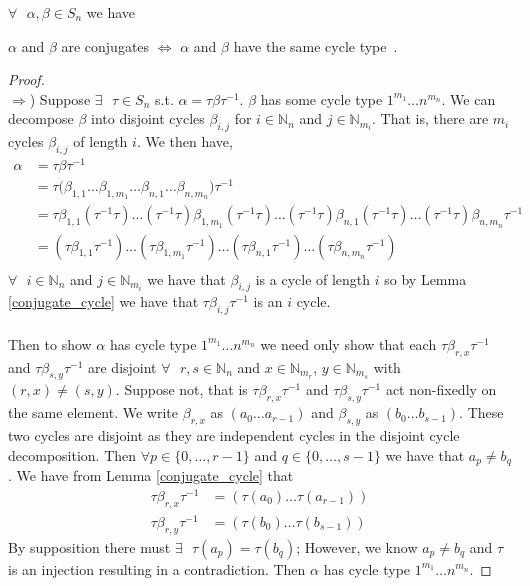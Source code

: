 \begin{theorem}
  \label{conjugate_cycle_type}
  $\forall\text{ }\alpha, \beta \in S_n$ we have
  \begin{center}
    $\alpha$ and $\beta$ are conjugates $\iff$ $\alpha$ and $\beta$
    have the same cycle type~\cite[p.~126]{dummit2004abstract}.
  \end{center}
\end{theorem}
\begin{proof}
\text{}\\$\Rightarrow$) Suppose $\exists\text{ }\tau\in S_n$ s.t.
$\alpha = \tau\beta\tau^{-1}$. $\beta$ has some cycle type
$1^{m_1}\dots n^{m_n}$. We can decompose
$\beta$ into disjoint cycles $\beta_{i,j}$ for $i\in\mathbb{N}_n$ and
$j\in\mathbb{N}_{m_i}$. That is, there are $m_i$ cycles $\beta_{i,j}$
of length $i$. We then have,
\begin{align*}
  \alpha & = \tau\beta\tau^{-1}
  \\
  & =
  \tau\bigl(\beta_{1,1}\dots\beta_{1,m_1}\dots\beta_{n,1}\dots\beta_{n,m_n}\bigr)\tau^{-1}
  \\
  & =
  \tau\beta_{1,1}(\tau^{-1}\tau)\dots(\tau^{-1}\tau)\beta_{1,m_1}(\tau^{-1}\tau)\dots(\tau^{-1}\tau)\beta_{n,1}(\tau^{-1}\tau)\dots(\tau^{-1}\tau)\beta_{n,m_n}\tau^{-1}
  \\
  & =
  (\tau\beta_{1,1}\tau^{-1})\dots(\tau\beta_{1,m_1}\tau^{-1})\dots(\tau\beta_{n,1}\tau^{-1})\dots(\tau\beta_{n,m_n}\tau^{-1})
  \\
\end{align*}
$\forall\text{ }i \in \mathbb{N}_n$ and $j \in \mathbb{N}_{m_i}$ we
have that $\beta_{i,j}$ is a cycle of length $i$ so
by Lemma \ref{conjugate_cycle} we have that $\tau\beta_{i,
j}\tau^{-1}$ is an $i$ cycle.
\\\\Then to show $\alpha$ has cycle type
$1^{m_1}\dots n^{m_n}$ we need only show that each
$\tau\beta_{r, x}\tau^{-1}$ and $\tau\beta_{s,
y}\tau^{-1}$ are disjoint $\forall\text{ }r,s\in\mathbb{N}_n$ and
$x\in\mathbb{N}_{m_r}$, $y\in\mathbb{N}_{m_s}$ with $(r,x) \ne
(s,y)$. Suppose not, that is
$\tau\beta_{r, x}\tau^{-1}$ and $\tau\beta_{s,
y}\tau^{-1}$ act non-fixedly on the same element. We write
$\beta_{r,x}$ as $(a_0\dots a_{r-1})$ and
$\beta_{s,y}$ as $(b_0\dots b_{s-1})$. These two
cycles are disjoint as they are independent cycles in the disjoint
cycle decomposition. Then $\forall\text{
}p\in\{0,\dots,r-1\}$ and $q\in\{0,\dots,s-1\}$ we
have that $a_p \ne b_q$.
We have from Lemma \ref{conjugate_cycle} that
\begin{align*}
  \tau\beta_{r, x}\tau^{-1} & = (\tau(a_0)\dots\tau(a_{r-1})) \\
  \tau\beta_{r, y}\tau^{-1} & = (\tau(b_0)\dots\tau(b_{s-1}))
\end{align*}
By supposition there must $\exists\text{ }\tau(a_p) = \tau(b_q)$;
However, we know $a_p \ne b_q$ and $\tau$ is an injection resulting in a
contradiction. Then $\alpha$ has cycle type
$1^{m_1}\dots n^{m_n}$.


\end{proof}
